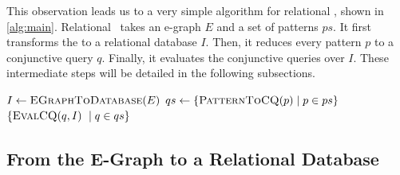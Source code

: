 This observation leads us to a very simple
 algorithm for relational \ematching,
 shown in \autoref{alg:main}.
Relational \ematching~takes an e-graph $E$ and a set
 of patterns $\textit{ps}$.
It first transforms the \egraph to a relational database $I$.
Then, it reduces every pattern $p$ to a conjunctive query $q$.
Finally, it evaluates the conjunctive queries over $I$.
These intermediate steps will be detailed in the following subsections.

\begin{algorithm}
  \LinesNumbered{} \SetAlgoLined{}
  $I  \gets \textsc{EGraphToDatabase}(E)$\;
  $qs \gets \{ \textsc{PatternToCQ}(p) \mid p \in ps \}$\;
  \Return $\{\textsc{EvalCQ}(q, I)\ \mid q \in qs \}$
  \caption{\textsc{RelationalEMatching}}
  \label{alg:main}
\end{algorithm}

\subsection{From the E-Graph to a Relational Database}


